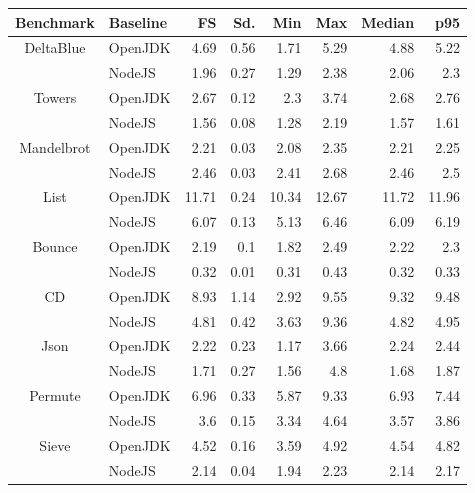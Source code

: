 \begin{center}
\begin{tabular}{ c | l r r r r r r}
\toprule
\textbf{Benchmark} & \textbf{Baseline} & \textbf{FS} & \textbf{Sd.} & \textbf{Min} & \textbf{Max} & \textbf{Median} & \textbf{p95}\\
\toprule

\multirow{2}{*}{ DeltaBlue } & OpenJDK & 4.69 & 0.56 & 1.71 & 5.29 & 4.88 & 5.22 \\
& NodeJS & 1.96 & 0.27 & 1.29 & 2.38 & 2.06 & 2.3 \\
\midrule

\multirow{2}{*}{ Towers } & OpenJDK & 2.67 & 0.12 & 2.3 & 3.74 & 2.68 & 2.76 \\
& NodeJS & 1.56 & 0.08 & 1.28 & 2.19 & 1.57 & 1.61 \\
\midrule

\multirow{2}{*}{ Mandelbrot } & OpenJDK & 2.21 & 0.03 & 2.08 & 2.35 & 2.21 & 2.25 \\
& NodeJS & 2.46 & 0.03 & 2.41 & 2.68 & 2.46 & 2.5 \\
\midrule

\multirow{2}{*}{ List } & OpenJDK & 11.71 & 0.24 & 10.34 & 12.67 & 11.72 & 11.96 \\
& NodeJS & 6.07 & 0.13 & 5.13 & 6.46 & 6.09 & 6.19 \\
\midrule

\multirow{2}{*}{ Bounce } & OpenJDK & 2.19 & 0.1 & 1.82 & 2.49 & 2.22 & 2.3 \\
& NodeJS & 0.32 & 0.01 & 0.31 & 0.43 & 0.32 & 0.33 \\
\midrule

\multirow{2}{*}{ CD } & OpenJDK & 8.93 & 1.14 & 2.92 & 9.55 & 9.32 & 9.48 \\
& NodeJS & 4.81 & 0.42 & 3.63 & 9.36 & 4.82 & 4.95 \\
\midrule

\multirow{2}{*}{ Json } & OpenJDK & 2.22 & 0.23 & 1.17 & 3.66 & 2.24 & 2.44 \\
& NodeJS & 1.71 & 0.27 & 1.56 & 4.8 & 1.68 & 1.87 \\
\midrule

\multirow{2}{*}{ Permute } & OpenJDK & 6.96 & 0.33 & 5.87 & 9.33 & 6.93 & 7.44 \\
& NodeJS & 3.6 & 0.15 & 3.34 & 4.64 & 3.57 & 3.86 \\
\midrule

\multirow{2}{*}{ Sieve } & OpenJDK & 4.52 & 0.16 & 3.59 & 4.92 & 4.54 & 4.82 \\
& NodeJS & 2.14 & 0.04 & 1.94 & 2.23 & 2.14 & 2.17 \\
\midrule


\end{tabular}
\end{center}
